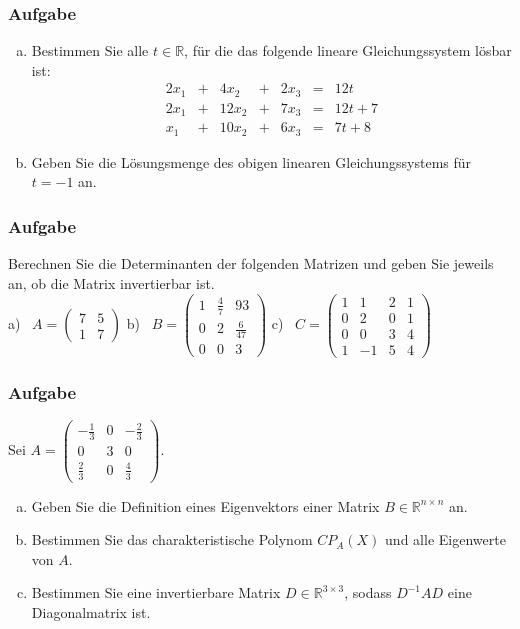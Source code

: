 \documentclass[a4paper,11pt]{scrartcl}
\newcounter{auf}
\newcommand{\Aufgabe}%
        {\addtocounter{auf}{1} \subsubsection*{\rmfamily  Aufgabe \theauf \hspace{1em}} }
\newcommand{\RR}{\mathbb{R}}
\begin{document}
\newpage
\Aufgabe
\begin{enumerate}[a)]
\item Bestimmen Sie alle $t\in\RR$, für die das folgende lineare Gleichungssystem lösbar ist:
\[\begin{array}{rrrrrrrrr}
2x_1&+&4x_2&+&2x_3&=&12t\\
2x_1&+&12x_2&+&7x_3&=&12t+7\\
x_1&+&10x_2&+&6x_3&=&7t+8
\end{array}\]
\item Geben Sie die Lösungsmenge des obigen linearen Gleichungssystems für $t=-1$ an.
\end{enumerate}

\newpage
\Aufgabe
Berechnen Sie die Determinanten der folgenden Matrizen und geben Sie jeweils an, ob die Matrix invertierbar ist.\\
%
\hspace*{10mm} a) \ $A=\begin{pmatrix} 7 & 5 \\ 1 & 7 \end{pmatrix}$ \qquad
b) \ $B=\begin{pmatrix} 1 & \frac{4}{7} & 93 \\ 0 & 2 & \frac{6}{47} \\ 0 & 0& 3 \end{pmatrix}$ \qquad
c) \ $C=\begin{pmatrix} 1 & 1 &  2 & 1 \\ 0 & 2 & 0 & 1 \\ 0 & 0& 3 & 4 \\ 1 & -1 & 5 & 4 \end{pmatrix}$



\newpage
\Aufgabe
Sei $A=\begin{pmatrix} -\frac{1}{3} & 0 & -\frac{2}{3} \\ 0 & 3 & 0 \\ \frac{2}{3} & 0 &\frac{4}{3} \end{pmatrix}$. 
\begin{enumerate}[a)]
\item Geben Sie die Definition eines Eigenvektors einer Matrix $B \in \RR^{n\times n}$ an.
\item Bestimmen Sie das charakteristische Polynom $CP_A(X)$ und alle Eigenwerte von $A$.
\item Bestimmen Sie eine invertierbare Matrix $D \in \RR^{3 \times 3}$, sodass $D^{-1}AD$ eine Diagonalmatrix ist.
\end{enumerate}
\end{document}
